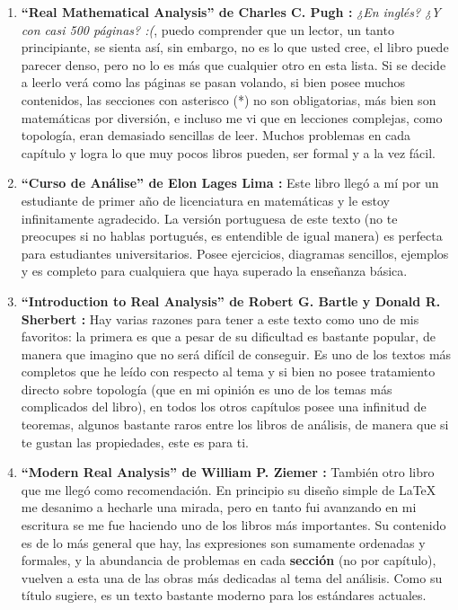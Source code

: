 \documentclass[11pt,oneside,a4paper]{book}
\begin{document}
\begin{enumerate}
\item \textbf{``Real Mathematical Analysis'' de Charles C. Pugh \cite{pugh2002real}:} \textit{¿En inglés? ¿Y con casi 500 páginas? :(}, puedo comprender que un lector, un tanto principiante, se sienta así, sin embargo, no es lo que usted cree, el libro puede parecer denso, pero no lo es más que cualquier otro en esta lista. Si se decide a leerlo verá como las páginas se pasan volando, si bien posee muchos contenidos, las secciones con asterisco (*) no son obligatorias, más bien son matemáticas por diversión, e incluso me vi que en lecciones complejas, como topología, eran demasiado sencillas de leer. Muchos problemas en cada capítulo y logra lo que muy pocos libros pueden, ser formal y a la vez fácil.
\item \textbf{``Curso de Análise'' de Elon Lages Lima \cite{lima1995curso}:} Este libro llegó a mí por un estudiante de primer año de licenciatura en matemáticas y le estoy infinitamente agradecido. La versión portuguesa de este texto (no te preocupes si no hablas portugués, es entendible de igual manera) es perfecta para estudiantes universitarios. Posee ejercicios, diagramas sencillos, ejemplos y es completo para cualquiera que haya superado la enseñanza básica.
\item \textbf{``Introduction to Real Analysis'' de Robert G. Bartle y Donald R. Sherbert \cite{bartle2011introduction}:} Hay varias razones para tener a este texto como uno de mis favoritos: la primera es que a pesar de su dificultad es bastante popular, de manera que imagino que no será difícil de conseguir. Es uno de los textos más completos que he leído con respecto al tema y si bien no posee tratamiento directo sobre topología (que en mi opinión es uno de los temas más complicados del libro), en todos los otros capítulos posee una infinitud de teoremas, algunos bastante raros entre los libros de análisis, de manera que si te gustan las propiedades, este es para ti.
\item \textbf{``Modern Real Analysis'' de William P. Ziemer \cite{gariepy1995modern}:} También otro libro que me llegó como recomendación. En principio su diseño simple de \LaTeX{} me desanimo a hecharle una mirada, pero en tanto fui avanzando en mi escritura se me fue haciendo uno de los libros más importantes. Su contenido es de lo más general que hay, las expresiones son sumamente ordenadas y formales, y la abundancia de problemas en cada \textbf{sección} (no por capítulo), vuelven a esta una de las obras más dedicadas al tema del análisis. Como su título sugiere, es un texto bastante moderno para los estándares actuales.

\end{enumerate}
\end{document}
